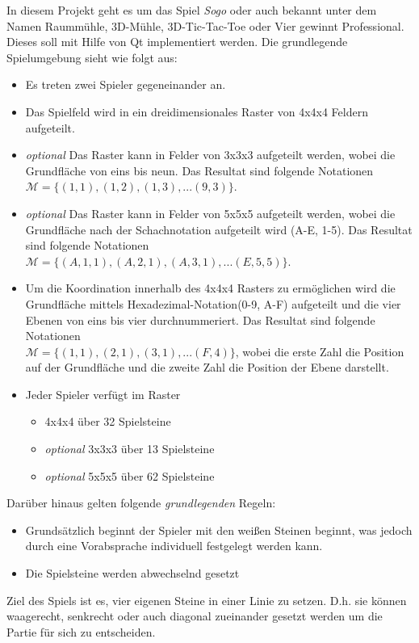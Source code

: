 \documentclass[a4paper]{scrartcl}
\begin{document}
In diesem Projekt geht es um das Spiel \textit{Sogo} oder auch bekannt unter dem Namen Raummühle, 3D-Mühle, 3D-Tic-Tac-Toe oder Vier gewinnt Professional. Dieses soll mit Hilfe von Qt implementiert werden. Die grundlegende Spielumgebung sieht wie folgt aus:
\begin{itemize}
	\item Es treten zwei Spieler gegeneinander an.
	\item Das Spielfeld wird in ein dreidimensionales Raster von 4x4x4 Feldern aufgeteilt.
	\item \textit{optional} Das Raster kann in Felder von 3x3x3 aufgeteilt werden, wobei die Grundfläche von eins bis neun. Das Resultat sind folgende Notationen\\ $\mathcal{M}=\{(1,1),(1,2),(1,3),...(9,3)\}$.
	\item \textit{optional} Das Raster kann in Felder von 5x5x5 aufgeteilt werden, wobei die Grundfläche nach der Schachnotation aufgeteilt wird (A-E, 1-5). Das Resultat sind folgende Notationen $\mathcal{M}=\{(A,1,1),(A,2,1),(A,3,1),...(E,5,5)\}$.
	\item Um die Koordination innerhalb des 4x4x4 Rasters zu ermöglichen wird die Grundfläche mittels Hexadezimal-Notation(0-9, A-F) aufgeteilt und die vier Ebenen von eins bis vier durchnummeriert. Das Resultat sind folgende Notationen\\ $\mathcal{M}=\{(1,1),(2,1),(3,1),...(F,4)\}$, wobei die erste Zahl die Position auf der Grundfläche und die zweite Zahl die Position der Ebene darstellt.
	\item Jeder Spieler verfügt im Raster
	\begin{itemize}
		\item 4x4x4 über 32 Spielsteine
		\item \textit{optional} 3x3x3 über 13 Spielsteine
		\item \textit{optional} 5x5x5 über 62 Spielsteine
	\end{itemize}	
\end{itemize}
Darüber hinaus gelten folgende \textit{grundlegenden} Regeln:
\begin{itemize}
	\item Grundsätzlich beginnt der Spieler mit den weißen Steinen beginnt, was jedoch durch eine Vorabsprache individuell festgelegt werden kann. 
	\item Die Spielsteine werden abwechselnd gesetzt
\end{itemize}
Ziel des Spiels ist es, vier eigenen Steine in einer Linie zu setzen. D.h. sie können waagerecht, senkrecht oder auch diagonal zueinander gesetzt werden um die Partie für sich zu entscheiden.
\end{document}
